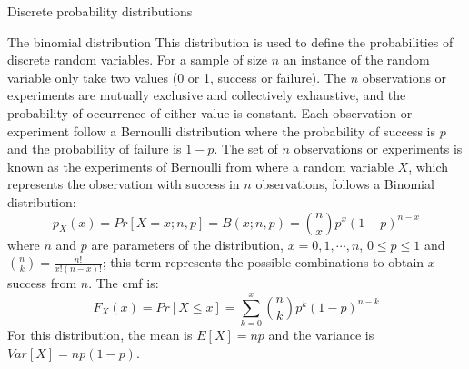 \documentclass[8pt]{beamer}
\renewcommand{\emph}[1]{\textcolor{myorange}{#1}}
\begin{document}
\begin{frame}{Discrete probability distributions}

    \begin{block}{The \alert{binomial} distribution}
        This distribution is used to define the probabilities of discrete random variables. For a sample of size $n$ an instance of the random variable only take two values (0 or 1, success or failure). The $n$ observations or experiments are mutually exclusive and collectively exhaustive, and the probability of occurrence of either value is constant. Each observation or experiment follow a \alert{Bernoulli distribution} where the probability of success is $p$ and the probability of failure is $1-p$. The set of $n$ observations or experiments is known as the experiments of Bernoulli from where a random variable $X$, which represents the observation with success in $n$ observations, follows a \alert{Binomial distribution}:
        \[
            p_X (x) = Pr[X = x; n,p] = B(x;n,p) = \binom{n}{x} p^x (1-p)^{n-x}
        \]
        where $n$ and $p$ are parameters of the distribution, $x=0,1,\cdots, n$, $0 \leq p \leq 1$ and $\binom{n}{k}=\frac{n!}{x! (n-x)!}$; this term represents the possible combinations to obtain $x$ success from $n$. The \emph{cmf} is:
        \[
            F_X (x) = Pr[X\leq x] = \sum_{k=0}^x \binom{n}{k} p^k (1-p)^{n-k}
        \]
        For this distribution, the mean is $E[X] = np$ and the variance is $Var[X] = np(1-p)$.
    \end{block}
    \end{frame}
\end{document}

